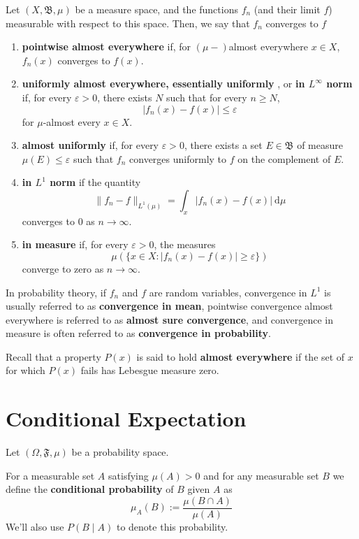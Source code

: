 Let $(X, \mathfrak{B}, \mu)$ be a measure space, and the functions $f_n$ (and their limit $f$) measurable with respect to this space. Then, we say that $f_n$ converges to $f$
\begin{enumerate}
	\item \textbf{pointwise almost everywhere} if, for $(\mu-)$almost everywhere $x \in X$, $f_n(x)$ converges to $f(x)$.
	\item \textbf{uniformly almost everywhere, essentially uniformly} , or \textbf{in $L^\infty$ norm} if, for every $\varepsilon > 0$, there exists $N$ such that for every $n \geq N$, \[ |f_n(x) - f(x)| \leq \varepsilon \] for $\mu$-almost every $x \in X$.
	\item \textbf{almost uniformly} if, for every $\varepsilon > 0$, there exists a set $E \in \mathfrak{B}$ of measure $\mu(E) \leq \varepsilon$ such that $f_n$ converges uniformly to $f$ on the complement of $E$.
	\item \textbf{in $L^1$ norm} if the quantity \[ \| f_n - f \|_{L^1(\mu)} = \int_x |f_n(x) - f(x)| ~\mathrm{d}\mu \] converges to $0$ as $n \to \infty$.
	\item \textbf{in measure} if, for every $\varepsilon > 0$, the measures \[ \mu (\{ x \in X : | f_n(x) - f(x) | \geq \varepsilon \}) \] converge to zero as $n \to \infty$.
\end{enumerate}

In probability theory, if $f_n$ and $f$ are random variables, convergence in $L^1$ is usually referred to as \textbf{convergence in mean}, pointwise convergence almost everywhere is referred to as \textbf{almost sure convergence}, and convergence in measure is often referred to as \textbf{convergence in probability}.

Recall that a property $P(x)$ is said to hold \textbf{almost everywhere} if the set of $x$ for which $P(x)$ fails has Lebesgue measure zero.

\section{Conditional Expectation}

Let $(\Omega, \mathfrak{F}, \mu)$ be a probability space.

\begin{definition}
For a measurable set $A$ satisfying $\mu(A) > 0$ and for any measurable set $B$ we define the \textbf{conditional probability} of $B$ given $A$ as
\[
	\mu_A(B) := \frac{\mu(B \cap A)}{\mu(A)} 
\]
We'll also use $P(B \mid A)$ to denote this probability.
\end{definition}

